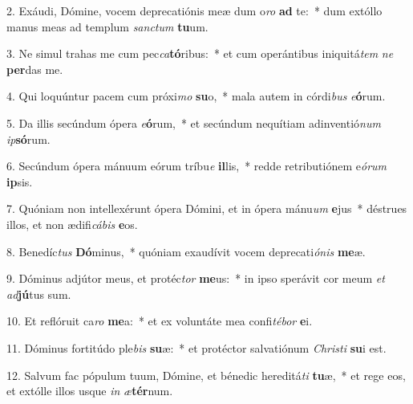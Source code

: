 2. Exáudi, Dómine, vocem deprecatiónis meæ dum o\textit{ro} \textbf{ad} te:~*  dum extóllo manus meas ad templum \textit{sanc}\textit{tum} \textbf{tu}um.\

3. Ne simul trahas me cum pec\textit{ca}\textbf{tó}ribus:~*  et cum operántibus iniquitá\textit{tem} \textit{ne} \textbf{per}das me.\

4. Qui loquúntur pacem cum próxi\textit{mo} \textbf{su}o,~*  mala autem in córdi\textit{bus} \textit{e}\textbf{ó}rum.\

5. Da illis secúndum ópera \textit{e}\textbf{ó}rum,~*  et secúndum nequítiam adinventió\textit{num} \textit{ip}\textbf{só}rum.\

6. Secúndum ópera mánuum eórum tríbu\textit{e} \textbf{il}lis,~*  redde retributiónem e\textit{ó}\textit{rum} \textbf{ip}sis.\

7. Quóniam non intellexérunt ópera Dómini, et in ópera mánu\textit{um} \textbf{e}jus~*  déstrues illos, et non ædifi\textit{cá}\textit{bis} \textbf{e}os.\

8. Benedíc\textit{tus} \textbf{Dó}minus,~*  quóniam exaudívit vocem deprecati\textit{ó}\textit{nis} \textbf{me}æ.\

9. Dóminus adjútor meus, et protéc\textit{tor} \textbf{me}us:~*  in ipso sperávit cor meum \textit{et} \textit{ad}\textbf{jú}tus sum.\

10. Et reflóruit ca\textit{ro} \textbf{me}a:~*  et ex voluntáte mea confi\textit{té}\textit{bor} \textbf{e}i.\

11. Dóminus fortitúdo ple\textit{bis} \textbf{su}æ:~*  et protéctor salvatiónum \textit{Chris}\textit{ti} \textbf{su}i est.\

12. Salvum fac pópulum tuum, Dómine, et bénedic hereditá\textit{ti} \textbf{tu}æ,~*  et rege eos, et extólle illos usque \textit{in} \textit{æ}\textbf{tér}num.\

